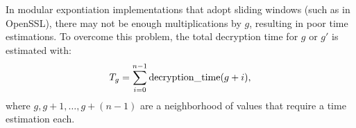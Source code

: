 In modular expontiation implementations that adopt sliding windows (such as in OpenSSL), there may not be enough multiplications by $g$, resulting in poor time estimations. To overcome this problem, the total decryption time for $g$ or $g'$ is estimated with: $$T_g = \sum\limits_{i = 0}^{n - 1} \operatorname{decryption\_time} (g + i),$$ where $g, g + 1, \dots, g + (n - 1)$ are a neighborhood of values that require a time estimation each.


